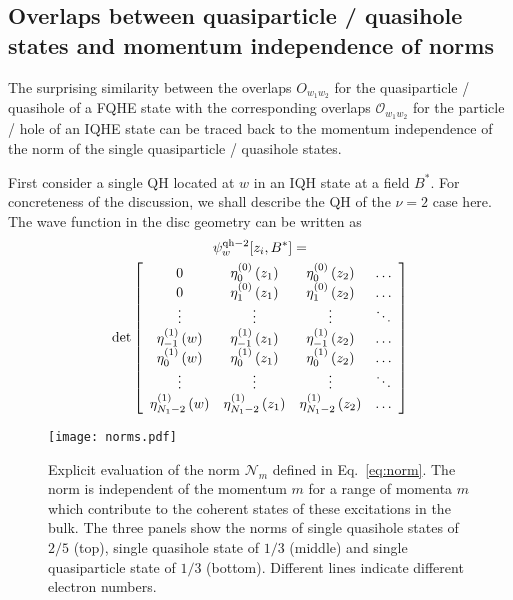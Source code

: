 \documentclass[twocolumn,floatfix,prb,aps,showpacs]{revtex4-2}
\begin{document}
\begin{appendix}


\section{Overlaps between quasiparticle / quasihole states and momentum independence of norms}
\label{overlap element}
The surprising similarity between the overlaps $O_{w_1w_2}$ for the quasiparticle / quasihole of a FQHE state with the corresponding overlaps $\mathcal{O}_{w_1w_2}$ for the particle / hole of an IQHE state 
can be traced back to the momentum independence of the norm of the single quasiparticle / quasihole states.


First consider a single QH located at $w$ in an IQH state at a field $B^*$. For concreteness of the discussion, we shall describe the QH of the $\nu=2$ case here. The wave function in the disc geometry can be written as 
\begin{multline}
\psi^{{\rm qh}-2}_w[z_i,B^*]=\\\det \left[\begin{array}{cccc}
0 & \eta^{(0)}_{0}\left(z_{1}\right) & \eta^{(0)}_{0}\left(z_{2}\right) & \dots\\
0 & \eta^{(0)}_{1}\left(z_{1}\right) & \eta^{(0)}_{1}\left(z_{2}\right) & \dots\\
\vdots & \vdots & \vdots & \ddots\\
\eta^{(1)}_{-1}\left(w\right) & \eta^{(1)}_{-1}\left(z_{1}\right) & \eta^{(1)}_{-1}\left(z_{2}\right) & \dots\\
\eta^{(1)}_{0}\left(w\right) & \eta^{(1)}_{0}\left(z_{1}\right) & \eta^{(1)}_{0}\left(z_{2}\right) & \dots\\
\vdots & \vdots & \vdots & \ddots\\
\eta^{(1)}_{N_{1}-2}\left(w\right)& \eta^{(1)}_{N_{1}-2}\left(z_{1}\right) & \eta^{(1)}_{N_{1}-2}\left(z_{2}\right) & \dots
\end{array}\right]\nonumber
\end{multline}

\begin{figure}[!htb]
\texttt{[image: norms.pdf]}
\caption{Explicit evaluation of the norm $\mathcal{N}_m$ defined in Eq.~\ref{eq:norm}.
The norm is independent of the momentum $m$ for a range of momenta $m$ which contribute to the coherent states of these excitations in the bulk. The three panels show the norms of single quasihole states of $2/5$ (top), single quasihole state of $1/3$ (middle) and single quasiparticle state of $1/3$ (bottom). Different lines indicate different electron numbers. 
\label{fig:norms}}
\end{figure}


\end{appendix}
\end{document}
